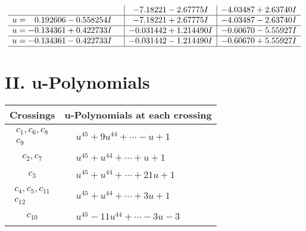 \documentclass[1p]{elsarticle_modified}
\theoremstyle{definition}
\begin{document}
$$\begin{array}{c|c|c}
 & -7.18221 - 2.67775 I & -4.03487 + 2.63740 I \\ \hline\begin{aligned}
u &= \phantom{-}0.192606 - 0.558254 I\end{aligned}
 & -7.18221 + 2.67775 I & -4.03487 - 2.63740 I \\ \hline\begin{aligned}
u &= -0.134361 + 0.422733 I\end{aligned}
 & -0.031442 + 1.214490 I & -0.60670 - 5.55927 I \\ \hline\begin{aligned}
u &= -0.134361 - 0.422733 I\end{aligned}
 & -0.031442 - 1.214490 I & -0.60670 + 5.55927 I\\
 \hline 
 \end{array}$$\newpage
\newpage\renewcommand{\arraystretch}{1}
\centering \section*{ II. u-Polynomials}
\begin{tabular}{m{50pt}|m{274pt}}
Crossings & \hspace{64pt}u-Polynomials at each crossing \\
\hline $$\begin{aligned}c_{1},c_{6},c_{8}\\c_{9}\end{aligned}$$&$\begin{aligned}
&u^{45}+9 u^{44}+\cdots- u+1
\end{aligned}$\\
\hline $$\begin{aligned}c_{2},c_{7}\end{aligned}$$&$\begin{aligned}
&u^{45}+u^{44}+\cdots+u+1
\end{aligned}$\\
\hline $$\begin{aligned}c_{3}\end{aligned}$$&$\begin{aligned}
&u^{45}+u^{44}+\cdots+21 u+1
\end{aligned}$\\
\hline $$\begin{aligned}c_{4},c_{5},c_{11}\\c_{12}\end{aligned}$$&$\begin{aligned}
&u^{45}+u^{44}+\cdots+3 u+1
\end{aligned}$\\
\hline $$\begin{aligned}c_{10}\end{aligned}$$&$\begin{aligned}
&u^{45}-11 u^{44}+\cdots-3 u-3
\end{aligned}$\\
\hline
\end{tabular}\newpage\renewcommand{\arraystretch}{1}
\end{document}
